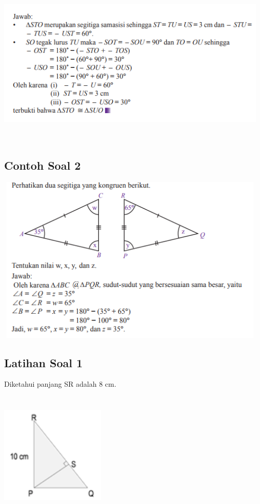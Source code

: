 \documentclass[11pt,fleqn]{book} %
\begin{document}
\includegraphics[width = 13cm, height= 8cm]{Pictures/a23.png}

\subsection{Contoh Soal 2}
\includegraphics[width = 13cm, height= 8cm]{Pictures/a24.png}
\subsection{Latihan Soal 1}
Diketahui panjang SR adalah 8 cm. 

\includegraphics[width = 5cm, height= 6cm]{Pictures/a27.png}
\end{document}
